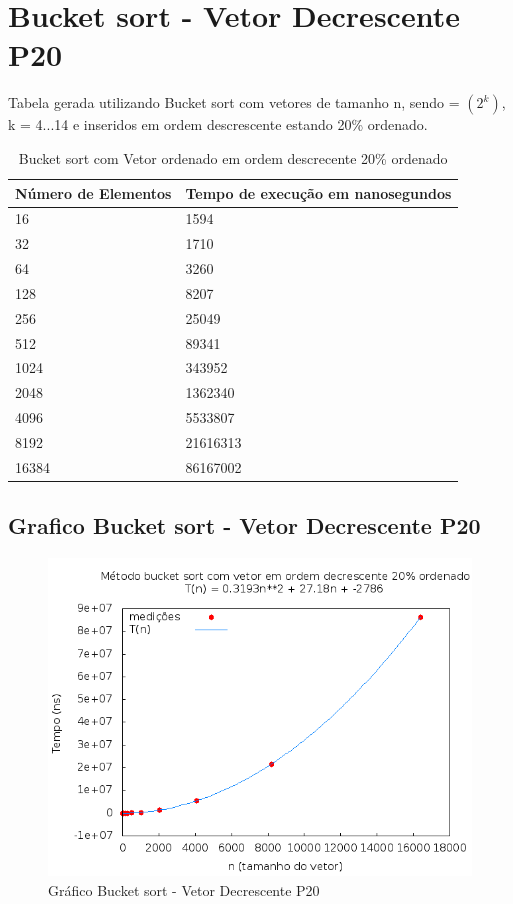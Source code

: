 \documentclass[12pt,a4paper,twoside]{report}
\begin{document}
\section{Bucket sort - Vetor Decrescente P20}
Tabela gerada utilizando Bucket sort com vetores de tamanho n, sendo = $(2^k)$, k = 4...14 e inseridos em ordem descrescente estando 20\% ordenado.

\begin{table}[H]
\centering
\caption{Bucket sort com Vetor ordenado em ordem descrecente 20\% ordenado}
\label{my-label}
\begin{tabular}{|l|l|}
\hline
\multicolumn{1}{|c|}{\textbf{Número de Elementos}} & \multicolumn{1}{c|}{\textbf{Tempo de execução em nanosegundos}} \\ \hline
16 & 1594 \\ \hline
32 & 1710 \\ \hline
64 & 3260 \\ \hline
128 & 8207 \\ \hline
256 & 25049 \\ \hline
512 & 89341 \\ \hline
1024 & 343952 \\ \hline
2048 & 1362340 \\ \hline
4096 & 5533807 \\ \hline
8192 & 21616313 \\ \hline
16384 & 86167002 \\ \hline
\end{tabular}
\end{table}

\subsection{Grafico Bucket sort - Vetor Decrescente P20}
\begin{figure}[H]
    \centering
    \includegraphics[width=0.7\linewidth]{graficos/Bucket/vIntDecrescenteP20/vIntDecrescenteP20.png}
  \caption{Gráfico Bucket sort - Vetor Decrescente P20}
\end{figure}
\end{document}
